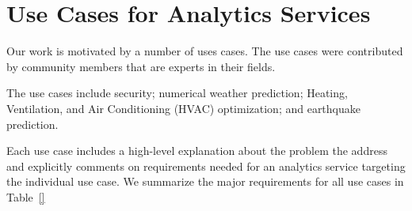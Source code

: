

\section{Use Cases for Analytics Services}
\label{sec:usecases}

Our work is motivated by a number of uses cases. The use cases were
contributed by community members that are experts in their fields.


The use cases include security; numerical weather prediction; 
Heating, Ventilation, and Air Conditioning (HVAC) optimization; and earthquake prediction. 


Each use case includes a high-level explanation about the problem the address and 
explicitly comments on requirements needed for an analytics service targeting the individual use case.
We summarize the major requirements for all use cases in Table~\ref{}


